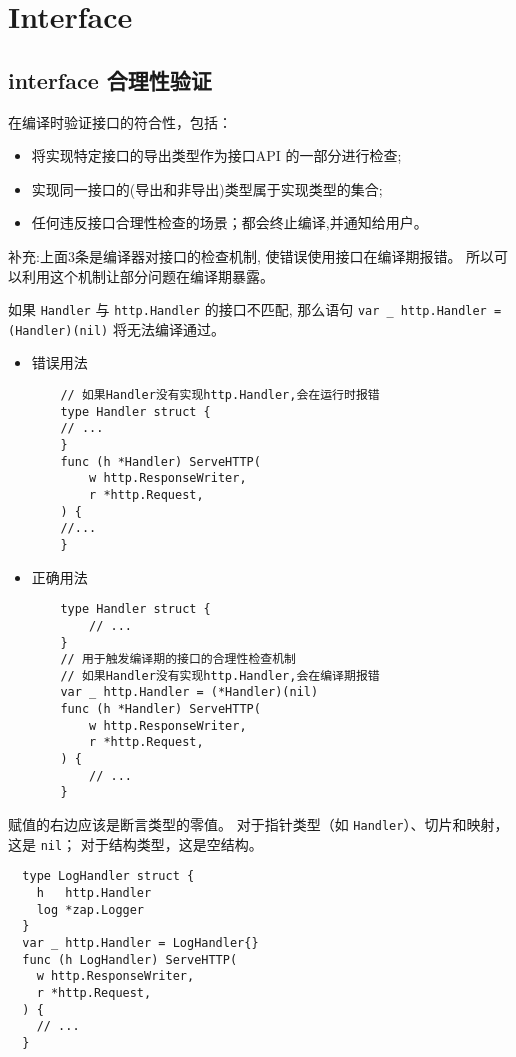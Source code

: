 \chapter{Interface}
\section{interface 合理性验证}
在编译时验证接口的符合性，包括：
\begin{itemize}[leftmargin=4em]
\item 将实现特定接口的导出类型作为接口API 的一部分进行检查;
\item 实现同一接口的(导出和非导出)类型属于实现类型的集合;
\item 任何违反接口合理性检查的场景；都会终止编译,并通知给用户。
\end{itemize}

补充:上面3条是编译器对接口的检查机制, 使错误使用接口在编译期报错。 所以可以利用这个机制让部分问题在编译期暴露。

如果 \texttt{\*Handler} 与 \texttt{http.Handler} 的接口不匹配,
那么语句 \texttt{var \_ http.Handler = (\*Handler)(nil)} 将无法编译通过。

\begin{itemize}[leftmargin=4em]
\item 错误用法

  \begin{verbatim}
    // 如果Handler没有实现http.Handler,会在运行时报错
    type Handler struct {
    // ...
    }
    func (h *Handler) ServeHTTP(
    	w http.ResponseWriter,
    	r *http.Request,
    ) {
    //...
    }
  \end{verbatim}
\item 正确用法

  \begin{verbatim}
    type Handler struct {
    	// ...
    }
    // 用于触发编译期的接口的合理性检查机制
    // 如果Handler没有实现http.Handler,会在编译期报错
    var _ http.Handler = (*Handler)(nil)
    func (h *Handler) ServeHTTP(
    	w http.ResponseWriter,
    	r *http.Request,
    ) {
    	// ...
    }
  \end{verbatim}
\end{itemize}

赋值的右边应该是断言类型的零值。 对于指针类型（如 \texttt{\*Handler}）、切片和映射，这是 \texttt{nil}； 对于结构类型，这是空结构。

\begin{verbatim}
  type LogHandler struct {
  	h   http.Handler
  	log *zap.Logger
  }
  var _ http.Handler = LogHandler{}
  func (h LogHandler) ServeHTTP(
  	w http.ResponseWriter,
  	r *http.Request,
  ) {
  	// ...
  }
\end{verbatim}

